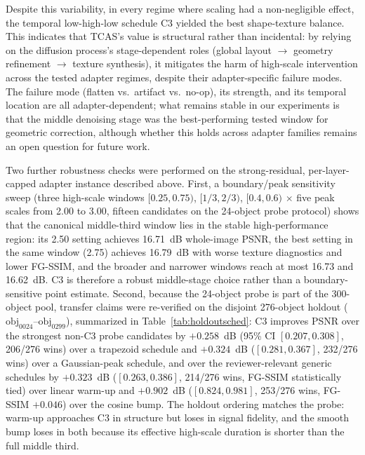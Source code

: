 \documentclass[times,twocolumn,final]{elsarticle}
\begin{document}
Despite this variability, in every regime where scaling had a non-negligible effect, the temporal low-high-low schedule C3 yielded the best shape-texture balance. This indicates that TCAS's value is structural rather than incidental: by relying on the diffusion process's stage-dependent roles (global layout $\to$ geometry refinement $\to$ texture synthesis), it mitigates the harm of high-scale intervention across the tested adapter regimes, despite their adapter-specific failure modes. The failure mode (flatten vs.\ artifact vs.\ no-op), its strength, and its temporal location are all adapter-dependent; what remains stable in our experiments is that the middle denoising stage was the best-performing tested window for geometric correction, although whether this holds across adapter families remains an open question for future work.

Two further robustness checks were performed on the strong-residual, per-layer-capped adapter instance described above. First, a boundary/peak sensitivity sweep (three high-scale windows $[0.25,0.75)$, $[1/3,2/3)$, $[0.4,0.6)$ $\times$ five peak scales from 2.00 to 3.00, fifteen candidates on the 24-object probe protocol) shows that the canonical middle-third window lies in the stable high-performance region: its 2.50 setting achieves 16.71~dB whole-image PSNR, the best setting in the same window (2.75) achieves 16.79~dB with worse texture diagnostics and lower FG-SSIM, and the broader and narrower windows reach at most 16.73 and 16.62~dB. C3 is therefore a robust middle-stage choice rather than a boundary-sensitive point estimate. Second, because the 24-object probe is part of the 300-object pool, transfer claims were re-verified on the disjoint 276-object holdout ($\mathrm{obj}_{0024}$--$\mathrm{obj}_{0299}$), summarized in Table~\ref{tab:holdoutsched}: C3 improves PSNR over the strongest non-C3 probe candidates by $+0.258$~dB (95\% CI $[0.207,0.308]$, 206/276 wins) over a trapezoid schedule and $+0.324$~dB ($[0.281,0.367]$, 232/276 wins) over a Gaussian-peak schedule, and over the reviewer-relevant generic schedules by $+0.323$~dB ($[0.263,0.386]$, 214/276 wins, FG-SSIM statistically tied) over linear warm-up and $+0.902$~dB ($[0.824,0.981]$, 253/276 wins, FG-SSIM $+0.046$) over the cosine bump. The holdout ordering matches the probe: warm-up approaches C3 in structure but loses in signal fidelity, and the smooth bump loses in both because its effective high-scale duration is shorter than the full middle third.
\end{document}
